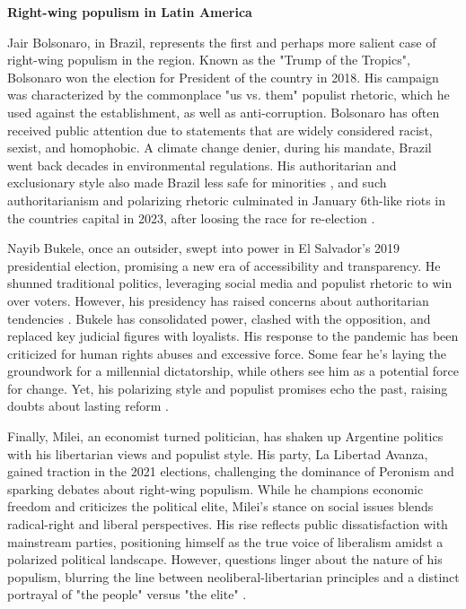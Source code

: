 \documentclass[12pt,letterpaper]{article}
\begin{document}
\vspace{.25cm}
\noindent \textbf{Right-wing populism in Latin America} 
\vspace{.25cm}

Jair Bolsonaro, in Brazil, represents the first and perhaps more salient case of right-wing populism in the region. Known as the "Trump of the Tropics", Bolsonaro won the election for President of the country in 2018. His campaign was characterized by the commonplace "us vs. them" populist rhetoric, which he used against the establishment, as well as anti-corruption. Bolsonaro has often received public attention due to statements that are widely considered racist, sexist, and homophobic. A climate change denier, during his mandate, Brazil went back decades in environmental regulations. His authoritarian and exclusionary style also made Brazil less safe for minorities \autocite{chueriPeopleEliteJair2018}, and such authoritarianism and polarizing rhetoric culminated in January 6th-like riots in the countries capital in 2023, after loosing the race for re-election \autocite{BrazilCollorCorruption}. 

Nayib Bukele, once an outsider, swept into power in El Salvador's 2019 presidential election, promising a new era of accessibility and transparency. He shunned traditional politics, leveraging social media and populist rhetoric to win over voters. However, his presidency has raised concerns about authoritarian tendencies \autocite{SignificanceNayibBukele}. Bukele has consolidated power, clashed with the opposition, and replaced key judicial figures with loyalists. His response to the pandemic has been criticized for human rights abuses and excessive force. Some fear he's laying the groundwork for a millennial dictatorship, while others see him as a potential force for change. Yet, his polarizing style and populist promises echo the past, raising doubts about lasting reform \autocite{OpinionCanStop}.

Finally, Milei, an economist turned politician, has shaken up Argentine politics with his libertarian views and populist style. His party, La Libertad Avanza, gained traction in the 2021 elections, challenging the dominance of Peronism and sparking debates about right-wing populism. While he champions economic freedom and criticizes the political elite, Milei's stance on social issues blends radical-right and liberal perspectives. His rise reflects public dissatisfaction with mainstream parties, positioning himself as the true voice of liberalism amidst a polarized political landscape. However, questions linger about the nature of his populism, blurring the line between neoliberal-libertarian principles and a distinct portrayal of "the people" versus "the elite" \autocite{sendraMileiPopulistPeople2024}. 
\end{document}
